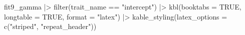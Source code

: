\documentclass[
  11pt,
  letterpaper,
  DIV=11,
  numbers=noendperiod]{scrartcl}
\newenvironment{Shaded}{}{}
\newcommand{\AttributeTok}[1]{\textcolor[rgb]{0.84,0.23,0.29}{#1}}
\newcommand{\ConstantTok}[1]{\textcolor[rgb]{0.00,0.36,0.77}{#1}}
\newcommand{\FunctionTok}[1]{\textcolor[rgb]{0.44,0.26,0.76}{#1}}
\newcommand{\NormalTok}[1]{\textcolor[rgb]{0.14,0.16,0.18}{#1}}
\newcommand{\SpecialCharTok}[1]{\textcolor[rgb]{0.00,0.36,0.77}{#1}}
\newcommand{\StringTok}[1]{\textcolor[rgb]{0.01,0.18,0.38}{#1}}
\begin{document}
\begin{Shaded}
\begin{Highlighting}[]
\NormalTok{fit9\_gamma }\SpecialCharTok{|\textgreater{}}
  \FunctionTok{filter}\NormalTok{(trait\_name }\SpecialCharTok{==} \StringTok{"intercept"}\NormalTok{) }\SpecialCharTok{|\textgreater{}}
  \FunctionTok{kbl}\NormalTok{(}\AttributeTok{booktabs =} \ConstantTok{TRUE}\NormalTok{, }\AttributeTok{longtable =} \ConstantTok{TRUE}\NormalTok{, }\AttributeTok{format =} \StringTok{"latex"}\NormalTok{) }\SpecialCharTok{|\textgreater{}}
  \FunctionTok{kable\_styling}\NormalTok{(}\AttributeTok{latex\_options =} \FunctionTok{c}\NormalTok{(}\StringTok{"striped"}\NormalTok{, }\StringTok{"repeat\_header"}\NormalTok{))}
\end{Highlighting}
\end{Shaded}
\end{document}
